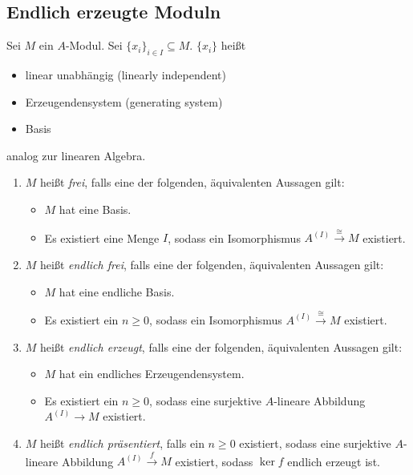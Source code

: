 \documentclass[12pt,a4paper]{scrartcl}
\theoremstyle{cplain}
\theoremstyle{cdef}
\begin{document}
\subsection{Endlich erzeugte Moduln}
\begin{defi}
	Sei $M$ ein $A$-Modul. Sei $\{x_i\}_{i\in I}\subseteq M$. $\{x_i\}$ heißt 
	\begin{itemize}
		\item linear unabhängig (linearly independent)
		\item Erzeugendensystem (generating system)
		\item Basis
	\end{itemize}
	analog zur linearen Algebra.
	\begin{enumerate}
        \item $M$ heißt \emph{frei}, falls eine der folgenden, äquivalenten Aussagen gilt:
        \begin{itemize}
            \item $M$ hat eine Basis.
            \item Es existiert eine Menge $I$, sodass ein Isomorphismus $A^{(I)}\xrightarrow{\cong}M$ existiert.
        \end{itemize}
        \item $M$ heißt \emph{endlich frei}, falls eine der folgenden, äquivalenten Aussagen gilt:
        \begin{itemize}
            \item $M$ hat eine endliche Basis.
            \item Es existiert ein $n \ge 0$, sodass ein Isomorphismus $A^{(I)}\xrightarrow{\cong}M$ existiert.
        \end{itemize}
        \item $M$ heißt \emph{endlich erzeugt}, falls eine der folgenden, äquivalenten Aussagen gilt:
        \begin{itemize}
            \item $M$ hat ein endliches Erzeugendensystem.
            \item Es existiert ein $n \ge 0$, sodass eine surjektive $A$-lineare Abbildung $A^{(I)}\to M$ existiert.
        \end{itemize}
        \item $M$ heißt \emph{endlich präsentiert}, falls ein $n \ge 0$ existiert, sodass eine surjektive $A$-lineare Abbildung $A^{(I)}\xrightarrow{f} M$ existiert, sodass $\ker f$ endlich erzeugt ist.
	\end{enumerate}
\end{defi}
\end{document}
